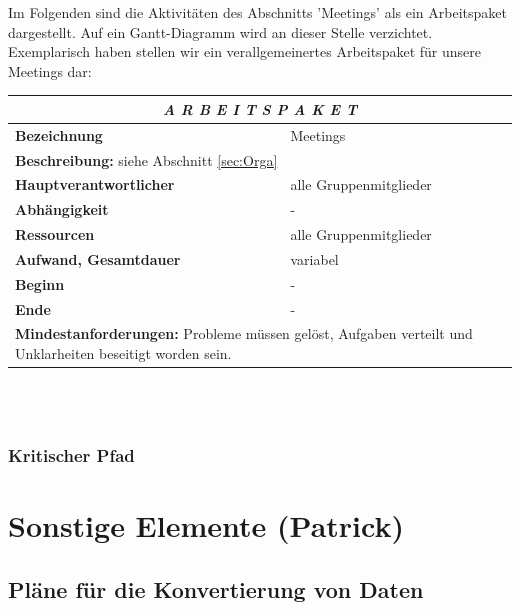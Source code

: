 \documentclass[fontsize=12pt,paper=a4,twoside]{scrartcl}
\begin{document}
Im Folgenden sind die Aktivitäten des Abschnitts 'Meetings' als ein Arbeitspaket dargestellt. Auf ein Gantt-Diagramm wird an dieser Stelle verzichtet.\\

Exemplarisch haben stellen wir ein verallgemeinertes Arbeitspaket für unsere Meetings dar: \\

\begin{tabular}{p{7.5cm}|p{7.5cm}}\toprule
\multicolumn{2}{c}{\textbf{\textit{A R B E I T S P A K E T \quad 8}}} \\ \toprule \hline
\textbf{Bezeichnung} & Meetings\\\hline
\multicolumn{2}{p{15cm}}{\textbf{Beschreibung:} \newline 
siehe Abschnitt \ref{sec:Orga}}  \\\hline
\textbf{Hauptverantwortlicher} & alle Gruppenmitglieder\\\hline
\textbf{Abhängigkeit} & -\\\hline
\textbf{Ressourcen} & alle Gruppenmitglieder\\\hline
\textbf{Aufwand, Gesamtdauer} & variabel  \\\hline
\textbf{Beginn} & - \\\hline
\textbf{Ende} & -\\\hline
\multicolumn{2}{p{15cm}}{\textbf{Mindestanforderungen: } Probleme müssen gelöst, Aufgaben verteilt und Unklarheiten beseitigt worden sein.  \newline
}  \\ \toprule
\end{tabular} \\\\ 

\subsubsection{Kritischer Pfad}\label{aps}

\section{Sonstige Elemente (Patrick)}

\subsection{Pläne für die Konvertierung von Daten}
\end{document}
